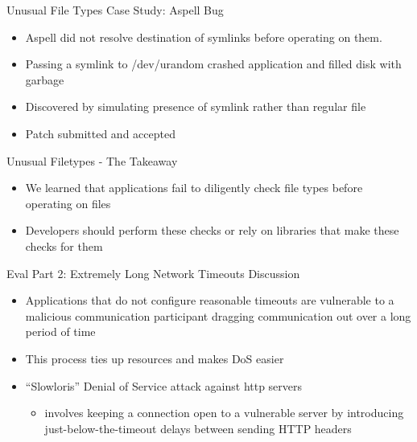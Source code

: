\documentclass[pdf]{beamer}
\begin{document}
\begin{frame}{Unusual File Types Case Study: Aspell Bug}
  \begin{itemize}
    \item{Aspell did not resolve destination of symlinks before operating
      on them.}
    \item{Passing a symlink to /dev/urandom crashed application and filled
      disk with garbage}
    \item{Discovered by simulating presence of symlink rather than regular
      file}
    \item{Patch submitted and accepted}
  \end{itemize}
\end{frame}


\begin{frame}{Unusual Filetypes - The Takeaway}

  \begin{itemize}
    \item{We learned that applications fail to diligently check file types
        before operating on files}
    \item{Developers should perform these checks or rely on libraries that
        make these checks for them}
  \end{itemize}
\end{frame}


\begin{frame}{Eval Part 2: Extremely Long Network Timeouts Discussion}



  \begin{itemize}
    \item{Applications that do not configure reasonable timeouts are vulnerable
      to a malicious communication participant dragging communication out over a
      long period of time}
    \item{This process ties up resources and makes DoS easier}
    \item{``Slowloris'' Denial of Service attack against http servers}
      \begin{itemize}
        \item{involves keeping a connection open to a vulnerable server by
          introducing just-below-the-timeout delays between sending HTTP headers}
      \end{itemize}
  \end{itemize}
\end{frame}
\end{document}
